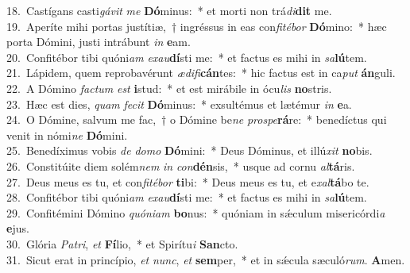 {18.~}Castígans casti\textit{gá}\textit{vit} \textit{me} \textbf{Dó}minus:~* et morti non trá\textit{di}\textbf{dit} me.\\
{19.~}Aperíte mihi portas justítiæ,~† ingréssus in eas con\textit{fi}\textit{té}\textit{bor} \textbf{Dó}mino:~* hæc porta Dómini, justi intrábunt \textit{in} \textbf{e}am.\\
{20.~}Confitébor tibi quóni\textit{am} \textit{e}\textit{xau}\textbf{dí}sti me:~* et factus es mihi in \textit{sa}\textbf{lú}tem.\\
{21.~}Lápidem, quem reprobavérunt \textit{æ}\textit{di}\textit{fi}\textbf{cán}tes:~* hic factus est in ca\textit{put} \textbf{án}guli.\\
{22.~}A Dómino \textit{fa}\textit{ctum} \textit{est} \textbf{i}stud:~* et est mirábile in ócu\textit{lis} \textbf{no}stris.\\
{23.~}Hæc est dies, \textit{quam} \textit{fe}\textit{cit} \textbf{Dó}minus:~* exsultémus et lætémur \textit{in} \textbf{e}a.\\
{24.~}O Dómine, salvum me fac,~† o Dómine be\textit{ne} \textit{pro}\textit{spe}\textbf{rá}re:~* benedíctus qui venit in nómi\textit{ne} \textbf{Dó}mini.\\
{25.~}Benedíximus vobis \textit{de} \textit{do}\textit{mo} \textbf{Dó}mini:~* Deus Dóminus, et illú\textit{xit} \textbf{no}bis.\\
{26.~}Constitúite diem solém\textit{nem} \textit{in} \textit{con}\textbf{dén}sis,~* usque ad cornu \textit{al}\textbf{tá}ris.\\
{27.~}Deus meus es tu, et con\textit{fi}\textit{té}\textit{bor} \textbf{ti}bi:~* Deus meus es tu, et e\textit{xal}\textbf{tá}bo te.\\
{28.~}Confitébor tibi quóni\textit{am} \textit{e}\textit{xau}\textbf{dí}sti me:~* et factus es mihi in \textit{sa}\textbf{lú}tem.\\
{29.~}Confitémini Dómino \textit{quó}\textit{ni}\textit{am} \textbf{bo}nus:~* quóniam in sǽculum misericórdi\textit{a} \textbf{e}jus.\\
{30.~}Glória \textit{Pa}\textit{tri}, \textit{et} \textbf{Fí}lio,~* et Spirítu\textit{i} \textbf{San}cto.\\
{31.~}Sicut erat in princípio, \textit{et} \textit{nunc}, \textit{et} \textbf{sem}per,~* et in sǽcula sæculó\textit{rum}. \textbf{A}men.\\
